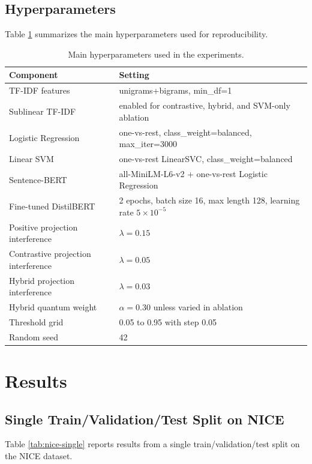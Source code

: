 \documentclass[runningheads]{llncs}
\begin{document}
\subsection{Hyperparameters}
Table \ref{tab:hyperparameters} summarizes the main hyperparameters used for
reproducibility.

\begin{table}[htbp]
\centering
\small
\caption{Main hyperparameters used in the experiments.}
\label{tab:hyperparameters}
\setlength{\tabcolsep}{4pt}
\begin{tabularx}{\textwidth}{@{}lX@{}}
\toprule
Component & Setting \\
\midrule
TF-IDF features & unigrams+bigrams, min\_df=1 \\
Sublinear TF-IDF & enabled for contrastive, hybrid, and SVM-only ablation \\
Logistic Regression & one-vs-rest, class\_weight=balanced, max\_iter=3000 \\
Linear SVM & one-vs-rest LinearSVC, class\_weight=balanced \\
Sentence-BERT & all-MiniLM-L6-v2 + one-vs-rest Logistic Regression \\
Fine-tuned DistilBERT & 2 epochs, batch size 16, max length 128, learning rate $5\times10^{-5}$ \\
Positive projection interference & $\lambda=0.15$ \\
Contrastive projection interference & $\lambda=0.05$ \\
Hybrid projection interference & $\lambda=0.03$ \\
Hybrid quantum weight & $\alpha=0.30$ unless varied in ablation \\
Threshold grid & 0.05 to 0.95 with step 0.05 \\
Random seed & 42 \\
\bottomrule
\end{tabularx}
\end{table}

\section{Results}
\subsection{Single Train/Validation/Test Split on NICE}
Table \ref{tab:nice-single} reports results from a single
train/validation/test split on the NICE dataset.
\end{document}
